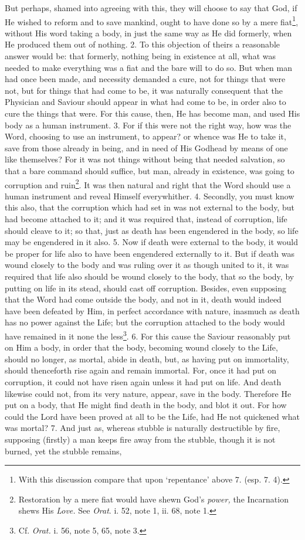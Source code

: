 But perhaps, shamed into agreeing with this, they will choose to say that God, if He wished to reform and to save mankind, ought to have done so by a mere fiat\footnote{With this discussion compare that upon ‘repentance’ above 7. (esp. 7. 4).}, without His word taking a body, in just the same way as He did formerly, when He produced them out of nothing. 2. To this objection of theirs a reasonable answer would be: that formerly, nothing being in existence at all, what was needed to make everything was a fiat and the bare will to do so. But when man had once been made, and necessity demanded a cure, not for things that were not, but for things that had come to be, it was naturally consequent that the Physician and Saviour should appear in what had come to be, in order also to cure the things that were. For this cause, then, He has become man, and used His body as a human instrument. 3. For if this were not the right way, how was the Word, choosing to use an instrument, to appear? or whence was He to take it, save from those already in being, and in need of His Godhead by means of one like themselves? For it was not things without being that needed salvation, so that a bare command should suffice, but man, already in existence, was going to corruption and ruin\footnote{Restoration by a mere fiat would have shewn God’s \emph{power,} the Incarnation shews His \emph{Love.} See \emph{Orat}. i. 52, note 1, ii. 68, note 1.}. It was then natural and right that the Word should use a human instrument and reveal Himself everywhither. 4. Secondly, you must know this also, that the corruption which had set in was not external to the body, but had become attached to it; and it was required that, instead of corruption, life should cleave to it; so that, just as death has been engendered in the body, so life may be engendered in it also. 5. Now if death were external to the body, it would be proper for life also to have been engendered externally to it. But if death was wound closely to the body and was ruling over it as though united to it, it was required that life also should be wound closely to the body, that so the body, by putting on life in its stead, should cast off corruption. Besides, even supposing that the Word had come outside the body, and not in it, death would indeed have been defeated by Him, in perfect accordance with nature, inasmuch as death has no power against the Life; but the corruption attached to the body would have remained in it none the less\footnote{Cf. \emph{Orat.} i. 56, note 5, 65, note 3.}. 6. For this cause the Saviour reasonably put on Him a body, in order that the body, becoming wound closely to the Life, should no longer, as mortal, abide in death, but, as having put on immortality, should thenceforth rise again and remain immortal. For, once it had put on corruption, it could not have risen again unless it had put on life. And death likewise could not, from its very nature, appear, save in the body. Therefore He put on a body, that He might find death in the body, and blot it out. For how could the Lord have been proved at all to be the Life, had He not quickened what was mortal? 7. And just as, whereas stubble is naturally destructible by fire, supposing (firstly) a man keeps fire away from the stubble, though it is not burned, yet the stubble remains, 